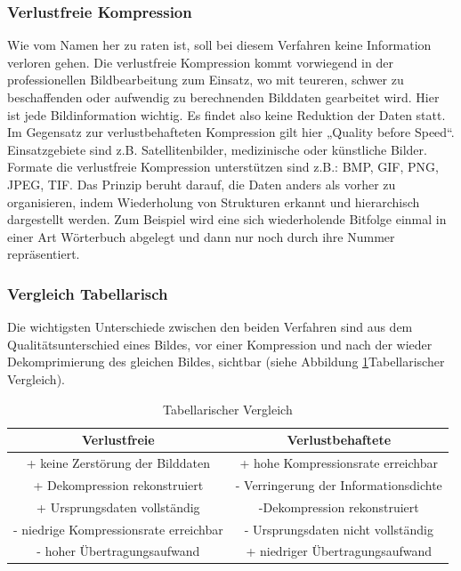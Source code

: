 \subsubsection{Verlustfreie Kompression}
Wie vom Namen her zu raten ist, soll bei diesem Verfahren keine Information verloren gehen. Die verlustfreie Kompression kommt vorwiegend in der professionellen Bildbearbeitung zum Einsatz, wo mit teureren, schwer zu beschaffenden oder aufwendig zu berechnenden Bilddaten gearbeitet wird. Hier ist jede Bildinformation wichtig. Es findet also keine Reduktion der Daten statt. Im Gegensatz zur verlustbehafteten Kompression gilt hier „Quality before Speed“. Einsatzgebiete sind z.B. Satellitenbilder, medizinische oder künstliche Bilder.
Formate die verlustfreie Kompression unterstützen sind z.B.: BMP, GIF, PNG, JPEG, TIF.
Das Prinzip beruht darauf, die Daten anders als vorher zu organisieren, indem Wiederholung von Strukturen erkannt und hierarchisch dargestellt werden. Zum Beispiel wird eine sich wiederholende Bitfolge einmal in einer Art Wörterbuch abgelegt und dann nur noch durch ihre Nummer repräsentiert.


\FloatBarrier %


\subsubsection{Vergleich Tabellarisch}
Die wichtigsten Unterschiede zwischen den beiden Verfahren sind aus dem Qualitätsunterschied eines Bildes, vor einer Kompression und nach der wieder Dekomprimierung des gleichen Bildes, sichtbar (siehe Abbildung \ref{fig:vergleich_steph}Tabellarischer Vergleich). 

\begin{table}[h]
\begin{tabular}{|c|c|}
\hline
 \textbf{Verlustfreie} & \textbf{Verlustbehaftete} \\
 \hline
 + keine Zerstörung der Bilddaten & + hohe Kompressionsrate erreichbar \\
 + Dekompression rekonstruiert & - Verringerung der Informationsdichte \\
 + Ursprungsdaten vollständig & -Dekompression rekonstruiert \\
 - niedrige Kompressionsrate erreichbar & - Ursprungsdaten nicht vollständig \\
 - hoher Übertragungsaufwand & + niedriger Übertragungsaufwand \\
 \hline

\end{tabular}
 \caption[Tabellarischer Vergleich]{Tabellarischer Vergleich}
	\label{fig:vergleich_steph}
\end{table}



